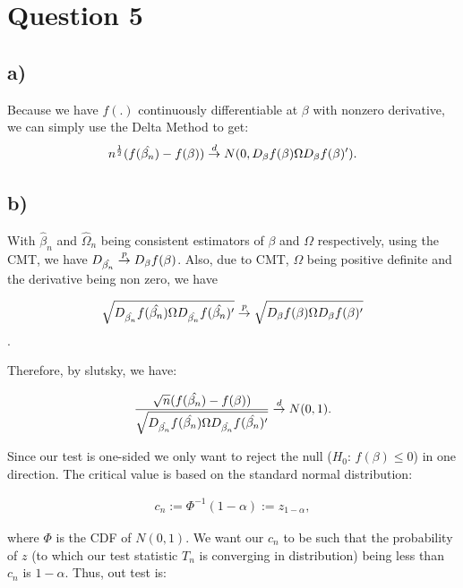 \documentclass[12pt]{paper}
\begin{document}



\section*{Question 5}

\subsection*{a)} Because we have $f(.)$ continuously differentiable
at $\beta$ with nonzero derivative, we can simply use the Delta Method to get:
\begin{align*}
n^{\frac{1}{2}}(f(\hat{\beta_n})-f(\beta))\overset{d}{\to} N(0,D_{\beta}f(\beta)\Omega D_{\beta}f(\beta)').
\end{align*}


\subsection*{b)}
With $\hat{\beta}_n$ and $\hat{\Omega}_n$ being consistent estimators of $\beta$ and $\Omega$ respectively, using the CMT, we have $D_{\hat{\beta_n}}\overset{p}{\to} D_{\beta}f(\beta)$. Also, due to CMT, $\Omega$ being positive definite and the derivative being non zero, we have 

$$\sqrt{D_{\hat{\beta_n}}f(\hat{\beta_n})\Omega D_{\hat{\beta_n}}f(\hat{\beta_n})'}\overset{p}{\to}\sqrt{D_{\beta}f(\beta)\Omega D_{\beta}f(\beta)'}$$.

Therefore, by slutsky, we have:

\begin{align*}
\frac{\sqrt{n}(f(\hat{\beta_n})-f(\beta))}{\sqrt{D_{\hat{\beta_n}}f(\hat{\beta_n})\Omega D_{\hat{\beta_n}}f(\hat{\beta_n})'}} \overset{d}{\to} N(0,1).
\end{align*}

Since our test is one-sided we only want to reject the null ($H_0$: $f(\beta) \leq 0$) in one direction. The critical value is based on the standard normal distribution:

\begin{align*}
c_n:=\Phi^{-1}(1-\alpha):=z_{1-\alpha},
\end{align*}

where $\Phi$ is the CDF of $N(0,1)$. We want our $c_n$ to be such that the probability of $z$ (to which our test statistic $T_n$ is converging in distribution) being less than $c_n$ is $1-\alpha$. Thus, out test is:
\end{document}

